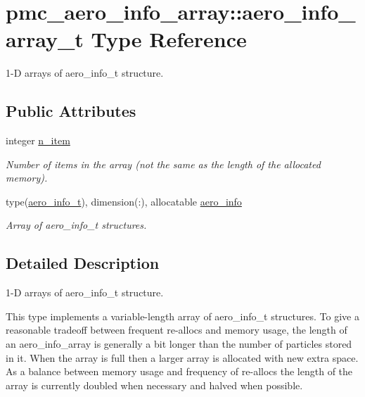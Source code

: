 \hypertarget{structpmc__aero__info__array_1_1aero__info__array__t}{}\section{pmc\+\_\+aero\+\_\+info\+\_\+array\+:\+:aero\+\_\+info\+\_\+array\+\_\+t Type Reference}
\label{structpmc__aero__info__array_1_1aero__info__array__t}


1-\/D arrays of aero\+\_\+info\+\_\+t structure.  


\subsection*{Public Attributes}
\begin{DoxyCompactItemize}
\item 
integer \mbox{\hyperlink{structpmc__aero__info__array_1_1aero__info__array__t_af686e922a026366c7c9eb9ed3bfc85ac}{n\+\_\+item}}
\begin{DoxyCompactList}\small\item\em Number of items in the array (not the same as the length of the allocated memory). \end{DoxyCompactList}\item 
type(\mbox{\hyperlink{structpmc__aero__info_1_1aero__info__t}{aero\+\_\+info\+\_\+t}}), dimension(\+:), allocatable \mbox{\hyperlink{structpmc__aero__info__array_1_1aero__info__array__t_a53c9429809f4d472083294d758a2852e}{aero\+\_\+info}}
\begin{DoxyCompactList}\small\item\em Array of aero\+\_\+info\+\_\+t structures. \end{DoxyCompactList}\end{DoxyCompactItemize}


\subsection{Detailed Description}
1-\/D arrays of aero\+\_\+info\+\_\+t structure. 

This type implements a variable-\/length array of aero\+\_\+info\+\_\+t structures. To give a reasonable tradeoff between frequent re-\/allocs and memory usage, the length of an aero\+\_\+info\+\_\+array is generally a bit longer than the number of particles stored in it. When the array is full then a larger array is allocated with new extra space. As a balance between memory usage and frequency of re-\/allocs the length of the array is currently doubled when necessary and halved when possible.


